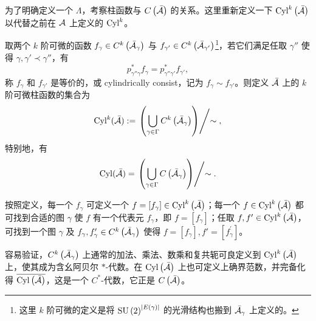 			为了明确定义一个 $\Lambda$，考察柱函数与 $C\left(\bar{\mathcal{A}}\right)$ 的关系。这里重新定义一下 $\mathrm{Cyl}^k\left(\bar{\mathcal{A}}\right)$ 以代替之前在 $\mathcal{A}$ 上定义的 $\mathrm{Cyl}^k$。
			\begin{Definition}
				取两个 $k$ 阶可微的函数 $f_\gamma \in C^k\left(\bar{\mathcal{A}}_\gamma\right)$ 与 $f_{\gamma'} \in C^k\left(\bar{\mathcal{A}}_{\gamma'}\right)$\footnote{这里 $k$ 阶可微的定义是将 $\mathrm{SU}\left(2\right)^{\abs{E(\gamma)}}$ 的光滑结构也搬到 $\bar{\mathcal{A}}_\gamma$ 上定义的。}，若它们满足任取 $\gamma''$ 使得 $\gamma , \gamma' \prec \gamma''$，有
				\begin{equation}
					p^*_{\gamma'' \gamma} f_\gamma = p^*_{\gamma'' \gamma'} f_{\gamma'},
				\end{equation}
				称 $f_\gamma$ 和 $f_{\gamma'}$ 是等价的，或 cylindrically consist，记为 $f_\gamma \sim f_{\gamma'}$。则定义 $\bar{\mathcal{A}}$ 上的 $k$ 阶可微柱函数的集合为
				\begin{equation}
					\mathrm{Cyl}^k(\bar{\mathcal{A}}) := \left. \left( \bigcup_{\gamma \in \Gamma} C^k \left(\bar{\mathcal{A}}_\gamma \right) \right) \middle/ \sim \right. ,
				\end{equation}
				特别地，有
				\begin{equation}
					\mathrm{Cyl}(\bar{\mathcal{A}}) = \left. \left( \bigcup_{\gamma \in \Gamma} C\left(\bar{\mathcal{A}}_\gamma\right) \right) \middle/ \sim \right. .
				\end{equation}
			\end{Definition}
			\begin{Remark}
				按照定义，每一个 $f_\gamma$ 可定义一个 $f= [f_\gamma] \in \mathrm{Cyl}^k\left(\bar{\mathcal{A}}\right)$；每一个 $f\in \mathrm{Cyl}^k\left(\bar{\mathcal{A}}\right)$ 都可找到合适的图 $\gamma$ 使 $f$ 有一个代表元 $f_\gamma$，即 $f=[f_\gamma]$；任取 $f,f' \in \mathrm{Cyl}^k\left(\bar{\mathcal{A}}\right)$，可找到一个图 $\gamma$ 及 $f_\gamma, f^\prime_\gamma \in C^k\left(\bar{\mathcal{A}}_\gamma\right)$ 使得 $f=[f_\gamma],f'=[f^\prime_\gamma]$。
			\end{Remark}

			容易验证，$C^k\left(\bar{\mathcal{A}}_\gamma\right)$ 上通常的加法、乘法、数乘和复共轭可良定义到 $\mathrm{Cyl}^k\left(\bar{\mathcal{A}}\right)$ 上，使其成为含幺阿贝尔 $*$-代数。在 $\mathrm{Cyl}\left(\bar{\mathcal{A}}\right)$ 上也可定义上确界范数，并完备化得 $\overline{\mathrm{Cyl}\left(\bar{\mathcal{A}}\right)}$，这是一个 $C^*$-代数，它正是 $C\left(\bar{\mathcal{A}}\right)$\cite{Thiemann2007}。
			
